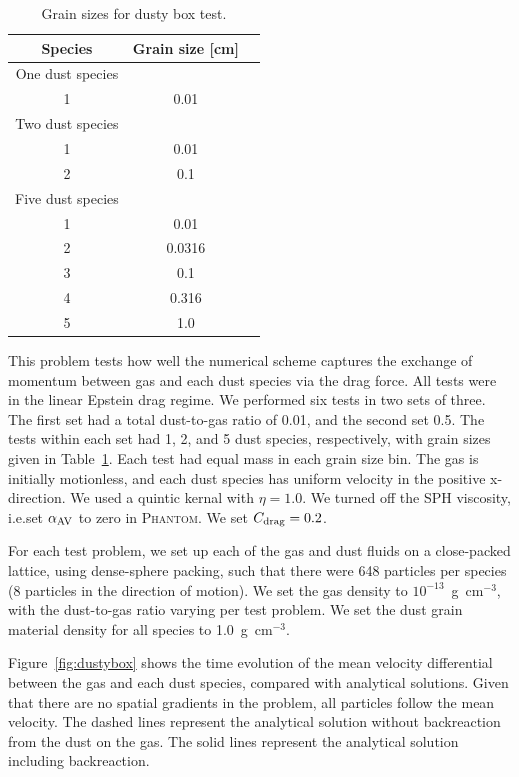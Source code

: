 \documentclass[fleqn,usenatbib]{mnras}
\begin{document}
\begin{table}
   \centering
   \begin{tabular}{ccc}
      \hline
      \hline
      Species & Grain size [cm] \\
      \hline
      \hline
      One dust species \\
      1 & 0.01 \\
      \hline
      Two dust species \\
      1 & 0.01 \\
      2 & 0.1 \\
      \hline
      Five dust species \\
      1 & 0.01 \\
      2 & 0.0316 \\
      3 & 0.1 \\
      4 & 0.316 \\
      5 & 1.0 \\
      \hline
      \hline
   \end{tabular}
   \caption{Grain sizes for dusty box test.}%
   \label{tab:box}
\end{table}

This problem tests how well the numerical scheme captures the exchange of
momentum between gas and each dust species via the drag force. All tests were in
the linear Epstein drag regime. We performed six tests in two sets of three. The
first set had a total dust-to-gas ratio of 0.01, and the second set 0.5. The
tests within each set had 1, 2, and 5 dust species, respectively, with grain
sizes given in Table~\ref{tab:box}. Each test had equal mass in each grain size
bin. The gas is initially motionless, and each dust species has uniform velocity
in the positive x-direction. We used a quintic kernal with \(\eta=1.0\). We
turned off the SPH viscosity, i.e.\@ set \(\alpha_{\rm AV}\) to zero in
\textsc{Phantom}. We set \(C_{\rm drag} = 0.2\).

For each test problem, we set up each of the gas and dust fluids on a
close-packed lattice, using dense-sphere packing, such that there were 648
particles per species (8 particles in the direction of motion). We set the gas
density to \(10^{-13}\)~g~cm\({}^{-3}\), with the dust-to-gas ratio varying per
test problem. We set the dust grain material density for all species to
1.0~g~cm\({}^{-3}\).

Figure~\ref{fig:dustybox} shows the time evolution of the mean velocity
differential between the gas and each dust species, compared with analytical
solutions. Given that there are no spatial gradients in the problem, all
particles follow the mean velocity. The dashed lines represent the analytical
solution without backreaction from the dust on the gas. The solid lines
represent the analytical solution including backreaction.
\end{document}
